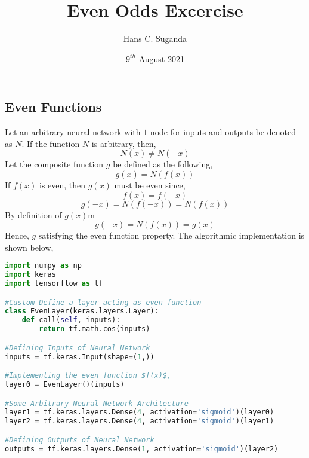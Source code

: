 \documentclass[a4paper, 12pt]{report}
\begin{document}
\title{Even Odds Excercise}
\author{Hans C. Suganda}
\date{$9^{th}$ August 2021}
\maketitle
\newpage



\begin{center}
\section*{Even Functions}
\begin{comment}
\end{comment}
Let an arbitrary neural network with $1$ node for inputs and outputs be denoted as $N$. If the function $N$ is arbitrary, then,
$$N(x) \neq N(-x)$$
Let the composite function $g$ be defined as the following, 
$$g(x) = N(f(x))$$
If $f(x)$ is even, then $g(x)$ must be even since,
$$f(x) = f(-x)$$
$$g(-x) = N(f(-x)) = N(f(x))$$
By definition of $g(x)$m
$$g(-x) = N(f(x)) = g(x)$$
Hence, $g$ satisfying the even function property. The algorithmic implementation is shown below,
\begin{lstlisting}[language = Python]
import numpy as np
import keras
import tensorflow as tf

#Custom Define a layer acting as even function
class EvenLayer(keras.layers.Layer):
    def call(self, inputs):
        return tf.math.cos(inputs)

#Defining Inputs of Neural Network
inputs = tf.keras.Input(shape=(1,))

#Implementing the even function $f(x)$,
layer0 = EvenLayer()(inputs)

#Some Arbitrary Neural Network Architecture
layer1 = tf.keras.layers.Dense(4, activation='sigmoid')(layer0)
layer2 = tf.keras.layers.Dense(4, activation='sigmoid')(layer1)

#Defining Outputs of Neural Network
outputs = tf.keras.layers.Dense(1, activation='sigmoid')(layer2)


\end{lstlisting}
\end{center}
\end{document}
